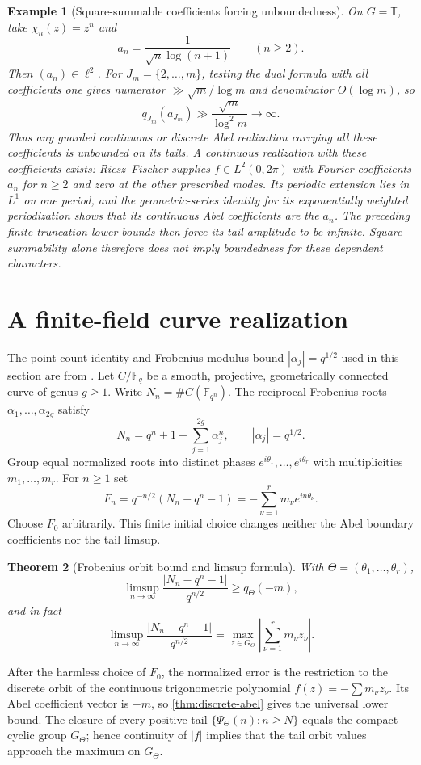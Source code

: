 \documentclass[12pt,a4paper,twoside]{extarticle}
\makeatletter
\theoremstyle{compactplain}
\newtheorem{theorem}{Theorem}[section]
\theoremstyle{compactdef}
\newtheorem{example}[theorem]{Example}
\renewenvironment{proof}[1][\proofname]{\par\pushQED{\qed}\normalfont
  \topsep2pt\trivlist\item[\hskip\labelsep\bfseries #1\@addpunct{.}]\ignorespaces}
 {\popQED\endtrivlist\@endpefalse}
\makeatother
\begin{document}
\begin{example}[Square-summable coefficients forcing unboundedness]
On $G=\mathbb T$, take $\chi_n(z)=z^n$ and
\[
 a_n=\frac1{\sqrt n\log(n+1)}\qquad(n\ge2).
\]
Then $(a_n)\in\ell^2$.  For $J_m=\{2,\dots,m\}$, testing the dual formula with all coefficients one gives numerator $\gg\sqrt m/\log m$ and denominator $O(\log m)$, so
\[
 q_{J_m}(a_{J_m})\gg\frac{\sqrt m}{\log^2m}\to\infty.
\]
Thus any guarded continuous or discrete Abel realization carrying all these coefficients is unbounded on its tails.  A continuous realization with these coefficients exists: Riesz--Fischer \cite{katznelson,rudin} supplies $f\in L^2(0,2\pi)$ with Fourier coefficients $a_n$ for $n\ge2$ and zero at the other prescribed modes.  Its periodic extension lies in $L^1$ on one period, and the geometric-series identity for its exponentially weighted periodization shows that its continuous Abel coefficients are the $a_n$.  The preceding finite-truncation lower bounds then force its tail amplitude to be infinite.  Square summability alone therefore does not imply boundedness for these dependent characters.
\end{example}

\section{A finite-field curve realization}\label{sec:finite-field}
The point-count identity and Frobenius modulus bound $|\alpha_j|=q^{1/2}$ used in this section are from \cite{weil,deligne}.
Let $C/\mathbb F_q$ be a smooth, projective, geometrically connected curve of genus $g\ge1$.  Write $N_n=\#C(\mathbb F_{q^n})$.  The reciprocal Frobenius roots $\alpha_1,\dots,\alpha_{2g}$ satisfy
\[
 N_n=q^n+1-\sum_{j=1}^{2g}\alpha_j^n,
 \qquad |\alpha_j|=q^{1/2}.
\]
Group equal normalized roots into distinct phases $e^{i\theta_1},\dots,e^{i\theta_r}$ with multiplicities $m_1,\dots,m_r$.  For $n\ge1$ set
\[
 F_n=q^{-n/2}(N_n-q^n-1)=-\sum_{\nu=1}^rm_\nu e^{in\theta_\nu}.
\]
Choose $F_0$ arbitrarily.  This finite initial choice changes neither the Abel boundary coefficients nor the tail limsup.

\begin{theorem}[Frobenius orbit bound and limsup formula]\label{thm:frobenius}
With $\Theta=(\theta_1,\dots,\theta_r)$,
\[
 \limsup_{n\to\infty}\frac{|N_n-q^n-1|}{q^{n/2}}
 \ge q_\Theta(-m),
\]
and in fact
\[
 \limsup_{n\to\infty}\frac{|N_n-q^n-1|}{q^{n/2}}
 =\max_{z\in G_\Theta}\left|\sum_{\nu=1}^rm_\nu z_\nu\right|.
\]
\end{theorem}
\begin{proof}
After the harmless choice of $F_0$, the normalized error is the restriction to the discrete orbit of the continuous trigonometric polynomial $f(z)=-\sum m_\nu z_\nu$.  Its Abel coefficient vector is $-m$, so \cref{thm:discrete-abel} gives the universal lower bound.  The closure of every positive tail $\{\Psi_\Theta(n):n\ge N\}$ equals the compact cyclic group $G_\Theta$; hence continuity of $|f|$ implies that the tail orbit values approach the maximum on $G_\Theta$.
\end{proof}
\end{document}
